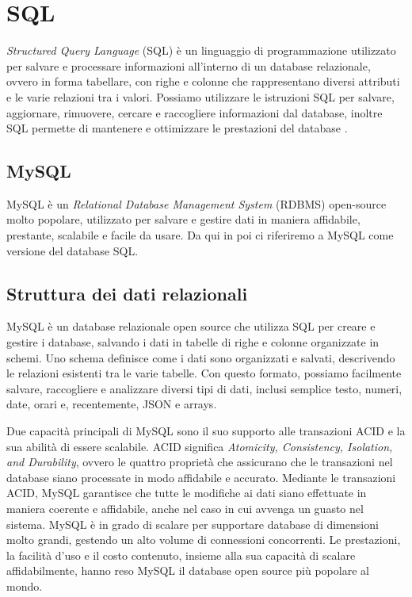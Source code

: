 \section{SQL}
\textit{Structured Query Language} (SQL) è un linguaggio di programmazione utilizzato per salvare e processare informazioni all'interno di un database relazionale, ovvero in forma tabellare, con righe e colonne che rappresentano diversi attributi e le varie relazioni tra i valori. Possiamo utilizzare le istruzioni SQL per salvare, aggiornare, rimuovere, cercare e raccogliere informazioni dal database, inoltre SQL permette di mantenere e ottimizzare le prestazioni del database \cite{SQL}.

\subsection{MySQL}
MySQL è un \textit{Relational Database Management System} (RDBMS) open-source molto popolare, utilizzato per salvare e gestire dati in maniera affidabile, prestante, scalabile e facile da usare. Da qui in poi ci riferiremo a MySQL come versione del database SQL.

\subsection{Struttura dei dati relazionali}
MySQL è un database relazionale open source che utilizza SQL per creare e gestire i database, salvando i dati in tabelle di righe e colonne organizzate in schemi. Uno schema definisce come i dati sono organizzati e salvati, descrivendo le relazioni esistenti tra le varie tabelle. Con questo formato, possiamo facilmente salvare, raccogliere e analizzare diversi tipi di dati, inclusi semplice testo, numeri, date, orari e, recentemente, JSON e arrays.

Due capacità principali di MySQL sono il suo supporto alle transazioni ACID e la sua abilità di essere scalabile. ACID significa \textit{Atomicity, Consistency, Isolation, and Durability}, ovvero le quattro proprietà che assicurano che le transazioni nel database siano processate in modo affidabile e accurato. Mediante le transazioni ACID, MySQL garantisce che tutte le modifiche ai dati siano effettuate in maniera coerente e affidabile, anche nel caso in cui avvenga un guasto nel sistema. MySQL è in grado di scalare per supportare database di dimensioni molto grandi, gestendo un alto volume di connessioni concorrenti. Le prestazioni, la facilità d'uso e il costo contenuto, insieme alla sua capacità di scalare affidabilmente, hanno reso MySQL il database open source più popolare al mondo.

